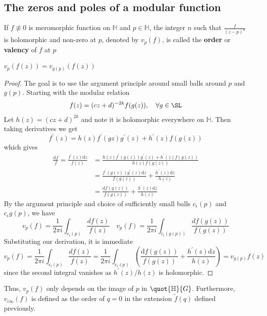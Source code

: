 \documentclass[12pt]{article}
\theoremstyle{definition}
\begin{document}
\subsection{The zeros and poles of a modular function}
\begin{dfn}
If \(f \not\equiv 0\) is meromorphic function on \(\mathbb{H}\)  and \(p \in \mathbb{H}\), the integer \(n\) such that \(\frac{f}{(z-p)^n}\) is holomorphic and non-zero at \(p\), denoted by \(v_p(f)\), is called the \textbf{order} or \textbf{valency} of \(f\) at \(p\)
\end{dfn}
\begin{claim}
    \(v_p(f(z))=v_{g(p)}(f(z))\) 
\end{claim}
\begin{proof}
The goal is to use the argument principle around small balls around \(p\) and \(g(p)\). Starting with the modular relation
\[
    f(z) = (cz+d)^{-2k} f(g(z)), \quad \forall g \in \SL
\]
Let \(h(z) = (cz+d)^{2k}\) and note it is holomorphic everywhere on \(\mathbb{H} \). Then taking derivatives we get
\[
    f^{\prime} (z) = h(z) f^{\prime} (gz) g^{\prime} (z) + h^{\prime} (z) f(g(z))
\] 
which gives
\begin{align*}
    \frac{\mathrm{d} f}{f} = \frac{f^{\prime} (z)\mathrm{d} z}{f(z)}&= \frac{h(z)f^{\prime} (g(z)) g^{\prime} (z)+ h^{\prime} (z) f(g(z))}{h(z)f(g(z))}\\
    &= \frac{f^{\prime} (g(z)) g^{\prime} (z) \mathrm{d} z}{f(g(z))} + \frac{h^{\prime} (z)\mathrm{d} z}{h(z)}\\
    &= \frac{\mathrm{d}f(g(z)) }{f(g(z))} + \frac{h^{\prime} (z)\mathrm{d} z}{h(z)}
\end{align*}
By the argument principle and choice of sufficiently small balls \(c_{\epsilon }(p) \) and \(c_{\epsilon }g(p)\), we have
\[
    v_p(f) = \frac{1}{2\pi  i} \int_{c_{\epsilon }(p)} \frac{df(z)}{f(z)}\quad v_p(f) = \frac{1}{2\pi  i} \int_{c_{\epsilon }(g(p))} \frac{df(g(z))}{f(g(z))}
\]
Substituting our derivation, it is immediate
\[
    v_p(f) = \frac{1}{2\pi i} \int_{c_{\epsilon }(p)} \frac{df(z)}{f(z)}= \frac{1}{2\pi i} \int_{c_{\epsilon }(p)} \left(\frac{\mathrm{d}f(g(z)) }{f(g(z))} + \frac{h^{\prime} (z)\mathrm{d} z}{h(z)}\right) = v_{g(p)}f(z) 
\]
since the second integral vanishes as \(h^{\prime} (z)/h(z)\) is holomorphic. 
\end{proof}
Thus, \(v_p(f)\) only depends on the image of \(p\) in \(\quot{\mathbb{H} }{G} \). Furthermore, \(v_{i\infty} (f)\) is defined as the order of \(q=0\) in the extension \(\widetilde{f}(q) \) defined previously.      
\end{document}
